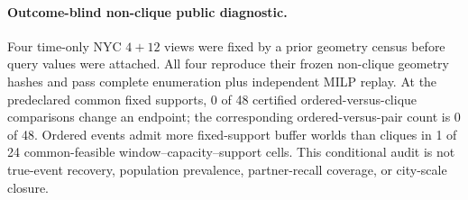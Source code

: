 \paragraph{Outcome-blind non-clique public diagnostic.}
Four time-only NYC $4+12$ views were fixed by a prior geometry census before query values were attached. All four reproduce their frozen non-clique geometry hashes and pass complete enumeration plus independent MILP replay.
At the predeclared common fixed supports, 0 of 48 certified ordered-versus-clique comparisons change an endpoint; the corresponding ordered-versus-pair count is 0 of 48.
Ordered events admit more fixed-support buffer worlds than cliques in 1 of 24 common-feasible window--capacity--support cells.
This conditional audit is not true-event recovery, population prevalence, partner-recall coverage, or city-scale closure.
